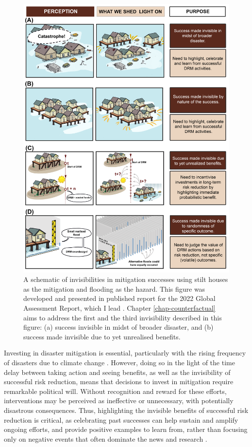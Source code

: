     \begin{figure}[h!]
    \begin{center}
     \includegraphics[width=\linewidth]{Figures/fig1_motivation.png}
		\caption{A schematic of invisibilities in mitigation successes using stilt houses as the mitigation and flooding as the hazard. This figure was developed and presented in published report for the 2022 Global Assessment Report, which I lead \citep{lallemant_rabonza_gar_2022}. Chapter \ref{chap-counterfactual} aims to address the first and the third invisibility described in this figure: (a) success invisible in midst of broader disaster, and (b) success made invisible due to yet unrealised benefits.}
	\label{fig:motivation}
	\end{center}
    \end{figure}

    Investing in disaster mitigation is essential, particularly with the rising frequency of disasters due to climate change \citep{IPCC_RN15}. However, doing so in the light of the time delay between taking action and seeing benefits, as well as the invisibility of successful risk reduction, means that decisions to invest in mitigation require remarkable political will. Without recognition and reward for these efforts, interventions may be perceived as ineffective or unnecessary, with potentially disastrous consequences. Thus, highlighting the invisible benefits of successful risk reduction is critical, as celebrating past successes can help sustain and amplify ongoing efforts, and provide positive examples to learn from, rather than focusing only on negative events that often dominate the news and research \citep[e.g.][]{leach2012transforming, scott1998seeing}.

